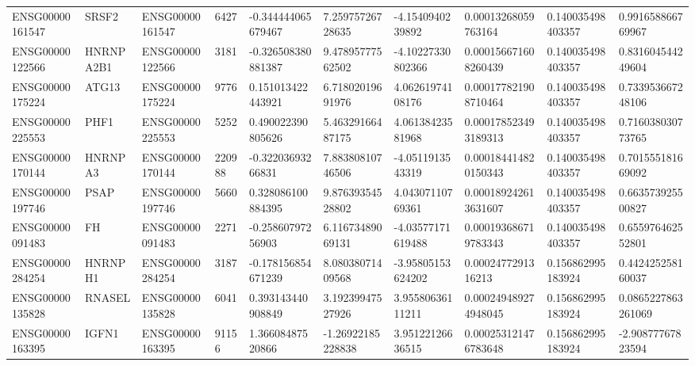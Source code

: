 \begin{tabular}{@{}llllllllll@{}}
ENSG00000161547 & SRSF2 & ENSG00000161547 & 6427 & -0.344444065679467 & 7.25975726728635 & -4.1540940239892 & 0.00013268059763164 & 0.140035498403357 & 0.991658866769967 \\
ENSG00000122566 & HNRNPA2B1 & ENSG00000122566 & 3181 & -0.326508380881387 & 9.47895777562502 & -4.10227330802366 & 0.000156671608260439 & 0.140035498403357 & 0.831604544249604 \\
ENSG00000175224 & ATG13 & ENSG00000175224 & 9776 & 0.151013422443921 & 6.71802019691976 & 4.06261974108176 & 0.000177821908710464 & 0.140035498403357 & 0.733953667248106 \\
ENSG00000225553 & PHF1 & ENSG00000225553 & 5252 & 0.490022390805626 & 5.46329166487175 & 4.06138423581968 & 0.000178523493189313 & 0.140035498403357 & 0.716038030773765 \\
ENSG00000170144 & HNRNPA3 & ENSG00000170144 & 220988 & -0.32203693266831 & 7.88380810746506 & -4.0511913543319 & 0.000184414820150343 & 0.140035498403357 & 0.701555181669092 \\
ENSG00000197746 & PSAP & ENSG00000197746 & 5660 & 0.328086100884395 & 9.87639354528802 & 4.04307110769361 & 0.000189242613631607 & 0.140035498403357 & 0.663573925500827 \\
ENSG00000091483 & FH & ENSG00000091483 & 2271 & -0.25860797256903 & 6.11673489069131 & -4.03577171619488 & 0.000193686719783343 & 0.140035498403357 & 0.655976462552801 \\
ENSG00000284254 & HNRNPH1 & ENSG00000284254 & 3187 & -0.178156854671239 & 8.08038071409568 & -3.95805153624202 & 0.0002477291316213 & 0.156862995183924 & 0.442425258160037 \\
ENSG00000135828 & RNASEL & ENSG00000135828 & 6041 & 0.393143440908849 & 3.19239947527926 & 3.95580636111211 & 0.000249489274948045 & 0.156862995183924 & 0.0865227863261069 \\
ENSG00000163395 & IGFN1 & ENSG00000163395 & 91156 & 1.36608487520866 & -1.26922185228838 & 3.95122126636515 & 0.000253121476783648 & 0.156862995183924 & -2.90877767823594 \\
\bottomrule
\end{tabular}
\endgroup
